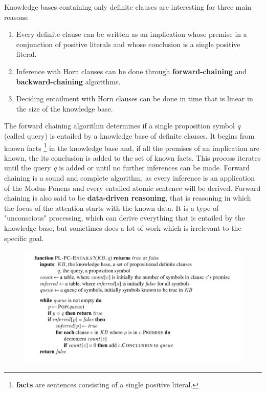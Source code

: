 \documentclass{article}
\begin{document}
Knowledge bases containing only definite clauses are interesting for three main reasons:
\begin{enumerate}
    \item Every definite clause can be written as an implication whose premise in a conjunction of positive literals and whose conclusion is a single positive literal.
    \item Inference with Horn clauses can be done through \textbf{forward-chaining} and \textbf{backward-chaining} algorithms.
    \item Deciding entailment with Horn clauses can be done in time that is linear in the size of the knowledge base.
\end{enumerate}

The forward chaining algorithm determines if a single proposition symbol \textit{q} (called query) is entailed by a knowledge base of definite clauses. It begins from known facts \footnote{
\textbf{facts} are sentences consisting of a single positive literal.
} in the knowledge base and, if all the premises of an implication are known, the its conclusion is added to the set of known facts. This process iterates until the query \textit{q} is added or until no further inferences can be made. Forward chaining is a sound and complete algorithm, as every inference is an application of the Modus Ponens and every entailed atomic sentence will be derived. Forward chaining is also said to be \textbf{data-driven reasoning}, that is reasoning in which the focus of the attention starts with the known data. It is a type of "unconscious" processing, which can derive everything that is entailed by the knowledge base, but sometimes does a lot of work which is irrelevant to the specific goal.

\begin{figure}[h]
    \centering
    \includegraphics[width=1\linewidth]{algorithms/PL Resolution Forward Chaining .png}
    \label{fig:PL_resolution_with_forward_chaining}
\end{figure}
\end{document}
